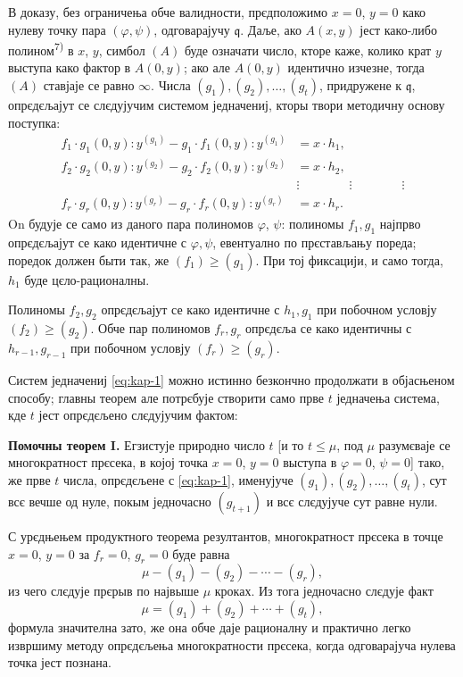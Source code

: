 \documentclass[11pt]{article}
\theoremstyle{plain}
\begin{document}
В доказу, без ограничења обче валидности, прєдположимо $x = 0$,
$y = 0$ како нулеву точку пара $(\varphi, \psi)$, одговарајучу
$\mathfrak{q}$. Даље, ако $A(x,y)$ јест како-либо полином\textsuperscript{7)}
в $x$, $y$, симбол $(A)$ буде означати число, кторе каже, колико
крат $y$ выступа како фактор в $A(0,y)$; ако але $A(0,y)$
идентично изчезне, тогда $(A)$ ставјаје се равно $\infty$. Числа
$(g_{1}), (g_{2}), \ldots, (g_{t})$, придружене к $\mathfrak{q}$,
опрєдєљајут се слєдујучим системом једначениј, кторы твори
методичну основу поступка:
\begin{equation}\label{eq:kap-1}
\begin{aligned}
f_{1}\cdot g_{1}(0,y):y^{(g_{1})} - g_{1}\cdot f_{1}(0,y):y^{(g_{1})} &= x\cdot h_{1},\\
f_{2}\cdot g_{2}(0,y):y^{(g_{2})} - g_{2}\cdot f_{2}(0,y):y^{(g_{2})} &= x\cdot h_{2},\\
&\vdots \qquad\qquad\vdots\qquad\qquad\vdots\\
f_{r}\cdot g_{r}(0,y):y^{(g_{r})} - g_{r}\cdot f_{r}(0,y):y^{(g_{r})} &= x\cdot h_{r}.
\end{aligned}
\end{equation}
On будује се само из даного пара полиномов $\varphi$, $\psi$:
полиномы $f_{1}, g_{1}$ најпрво опрєдєљајут се како идентичне с
$\varphi, \psi$, евентуално по прєстављању пореда; поредок
должен быти так, же $(f_{1}) \geq (g_{1})$. При тој фиксацији, и
само тогда, $h_{1}$ буде цєло-рационалны.

Полиномы $f_{2}, g_{2}$ опрєдєљајут се како идентичне с
$h_{1}, g_{1}$ при побочном условју $(f_{2}) \geq (g_{2})$. Обче пар
полиномов $f_{r}, g_{r}$ опрєдєља се како идентичны с
$h_{r-1}, g_{r-1}$ при побочном условју $(f_{r}) \geq (g_{r})$.

Систем једначениј \eqref{eq:kap-1} можно истинно безкончно
продолжати в објасњеном способу; главны теорем але потрєбује
створити само прве $t$ једначења система, кде $t$ јест опрєдєљено
слєдујучим фактом:

\smallskip
\textbf{Помочны теорем I.} Егзистује природно число $t$ [и то
$t \leq \mu$, под $\mu$ разумєваје се многократност прєсека, в којој
точка $x = 0$, $y = 0$ выступа в $\varphi = 0$, $\psi = 0$] тако, же
прве $t$ числа, опрєдєљене с \eqref{eq:kap-1}, именујуче
$(g_{1}), (g_{2}), \ldots, (g_{t})$, сут всє вечше од нуле, покым
једночасно $(g_{t+1})$ и всє слєдујуче сут равне нули.

С урєдњењем продуктного теорема резултантов, многократност
прєсека в точце $x = 0$, $y = 0$ за $f_{r} = 0$, $g_{r} = 0$ буде
равна
\[
\mu - (g_{1}) - (g_{2}) - \cdots - (g_{r}),
\]
из чего слєдује прєрыв по највыше $\mu$ кроках. Из тога једночасно
слєдује факт
\begin{equation}\label{eq:kap-2}
\mu = (g_{1}) + (g_{2}) + \cdots + (g_{t}),
\end{equation}
формула значителна зато, же она обче даје рационалну и практично
легко извршиму методу опрєдєљења многократности прєсека, когда
одговарајуча нулева точка јест познана.
\end{document}
